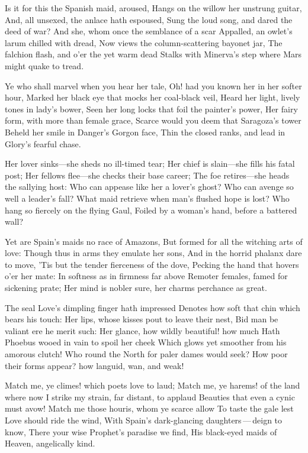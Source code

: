 \documentclass[10pt,twocolumn]{book}
\begin{document}
   Is it for this the Spanish maid, aroused,
   Hangs on the willow her unstrung guitar,
   And, all unsexed, the anlace hath espoused,
   Sung the loud song, and dared the deed of war?
   And she, whom once the semblance of a scar
   Appalled, an owlet's larum chilled with dread,
   Now views the column-scattering bayonet jar,
   The falchion flash, and o'er the yet warm dead
Stalks with Minerva's step where Mars might quake to tread.


   Ye who shall marvel when you hear her tale,
   Oh! had you known her in her softer hour,
   Marked her black eye that mocks her coal-black veil,
   Heard her light, lively tones in lady's bower,
   Seen her long locks that foil the painter's power,
   Her fairy form, with more than female grace,
   Scarce would you deem that Saragoza's tower
   Beheld her smile in Danger's Gorgon face,
Thin the closed ranks, and lead in Glory's fearful chase.


   Her lover sinks---she sheds no ill-timed tear;
   Her chief is slain---she fills his fatal post;
   Her fellows flee---she checks their base career;
   The foe retires---she heads the sallying host:
   Who can appease like her a lover's ghost?
   Who can avenge so well a leader's fall?
   What maid retrieve when man's flushed hope is lost?
   Who hang so fiercely on the flying Gaul,
Foiled by a woman's hand, before a battered wall?


   Yet are Spain's maids no race of Amazons,
   But formed for all the witching arts of love:
   Though thus in arms they emulate her sons,
   And in the horrid phalanx dare to move,
   'Tis but the tender fierceness of the dove,
   Pecking the hand that hovers o'er her mate:
   In softness as in firmness far above
   Remoter females, famed for sickening prate;
Her mind is nobler sure, her charms perchance as great.


   The seal Love's dimpling finger hath impressed
   Denotes how soft that chin which bears his touch:
   Her lips, whose kisses pout to leave their nest,
   Bid man be valiant ere he merit such:
   Her glance, how wildly beautiful! how much
   Hath Phoebus wooed in vain to spoil her cheek
   Which glows yet smoother from his amorous clutch!
   Who round the North for paler dames would seek?
How poor their forms appear? how languid, wan, and weak!


   Match me, ye climes! which poets love to laud;
   Match me, ye harems! of the land where now
   I strike my strain, far distant, to applaud
   Beauties that even a cynic must avow!
   Match me those houris, whom ye scarce allow
   To taste the gale lest Love should ride the wind,
   With Spain's dark-glancing daughters\,---\,deign to know,
   There your wise Prophet's paradise we find,
His black-eyed maids of Heaven, angelically kind.
\end{document}
